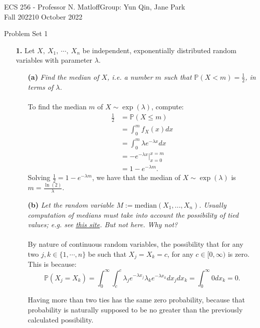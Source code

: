\documentclass [10pt] {article}
\newcommand{\ds}{\displaystyle}
\renewcommand{\P}{\mathbb{P}}
\begin{document}
{\noindent}ECS 256 - Professor N. Matloff\hfill Group: Yun Qin, Jane Park\\
Fall 2022\hfill 10 October 2022
\begin{center}{\Large Problem Set 1}\end{center}
\begin{enumerate}
\item[{\bf1.}] Let $X, \ X_1, \ \cdots, \ X_n$ be independent, exponentially distributed random variables with parameter $\lambda$.
\begin{enumerate}
\item[{\bf(a)}] {\it Find the median of $X$, i.e. a number $m$ such that $\P(X < m) = \ds\frac{1}{2}$, in terms of $\lambda$.}\\\\
To find the median $m$ of $X\sim\exp(\lambda)$, compute:
\begin{align*}
    \frac{1}{2} &= \P(X\le m)\\
    &=\int_0^mf_X(x)dx\\
    &=\int_0^m\lambda e^{-\lambda x}dx\\
    &=-e^{-\lambda x}\bigg\vert_{x=0}^{x=m}\\
    &=1-e^{-\lambda m}.
\end{align*}
Solving $\ds\frac{1}{2}=1-e^{-\lambda m}$, we have that the median of $X\sim\exp(\lambda)$ is $\ds m = \frac{\ln(2)}{\lambda}$.
\item[{\bf(b)}] {\it Let the random variable $M := \text{median}(X_1,...,X_n)$. Usually computation of medians must take into account the possibility of tied values; e.g. see \href{http://minato.sip21c.org/msb/man/truemedian.html}{this site}. But not here. Why not?}\\\\

By nature of continuous random variables, the possibility that for any two $j,k\in\{1,\cdots,n\}$ be such that $X_j = X_k=c$, for any $c\in[0,\infty)$ is zero. This is because:
$$\P(X_j=X_k)=\int_0^\infty\int_{c}^c\lambda_j e^{-\lambda x_j}\lambda_k e^{-\lambda x_k}dx_jdx_k=\int_0^\infty 0 dx_k=0.$$

Having more than two ties has the same zero probability, because that probability is naturally supposed to be no greater than the previously calculated possibility.


\end{enumerate}
\end{enumerate}
\end{document}

